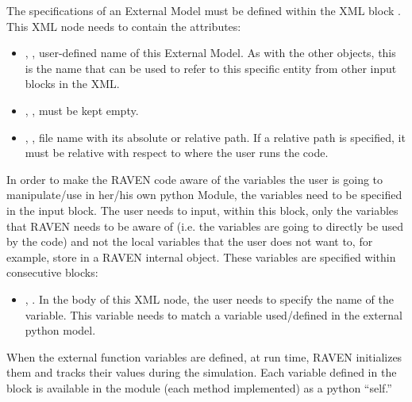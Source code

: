 The specifications of an External Model must be defined within the XML block
.
%
This XML node needs to contain the attributes:

\vspace{-5mm}
\begin{itemize}
  \itemsep0em
  \item {}, , user-defined name
  of this External Model.
  \nb As with the other objects, this is the name that can be used to refer to
  this specific entity from other input blocks in the XML.
  \item {}, , must be kept
  empty.
  \item {}, , file name
  with its absolute or relative path.
  \nb If a relative path is specified, it must be relative with respect to where
  the user runs the code.
\end{itemize}
\vspace{-5mm}

In order to make the RAVEN code aware of the variables the user is going to
manipulate/use in her/his own python Module, the variables need to be specified
in the  input block.
%
The user needs to input, within this block, only the variables that RAVEN needs
to be aware of (i.e. the variables are going to directly be used by the code)
and not the local variables that the user does not want to, for example, store
in a RAVEN internal object.
%
These variables are specified within consecutive  blocks:
\begin{itemize}
  \item {}, .
  In the body of this XML node, the user needs to specify the name of the
  variable.
  This variable needs to match a variable used/defined in the external python
  model.
\end{itemize}

When the external function variables are defined, at run time, RAVEN initializes
them and tracks their values during the simulation.
%
Each variable defined in the  block is available in the
module (each method implemented) as a python ``self.''
%

